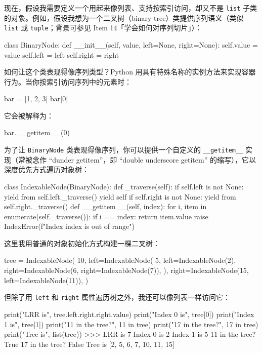 现在，假设我需要定义一个用起来像列表、支持按索引访问，却又不是 \texttt{list} 子类的对象。例如，假设我想为一个二叉树（binary tree）类提供序列语义（类似 \texttt{list} 或 \texttt{tuple}；背景可参见 Item 14「学会如何对序列切片」）：

\begin{codebox}[python]
class BinaryNode:
    def __init__(self, value, left=None, right=None):
        self.value = value
        self.left = left
        self.right = right
\end{codebox}

如何让这个类表现得像序列类型？Python 用具有特殊名称的实例方法来实现容器行为。当你按索引访问序列中的元素时：

\begin{codebox}[python]
bar = [1, 2, 3]
bar[0]
\end{codebox}

它会被解释为：

\begin{codebox}[python]
bar.__getitem__(0)
\end{codebox}

为了让 \texttt{BinaryNode} 类表现得像序列，你可以提供一个自定义的 \texttt{\_\_getitem\_\_} 实现（常被念作 ``dunder getitem''，即 ``double underscore getitem'' 的缩写），它以深度优先方式遍历对象树：

\begin{codebox}[python]
class IndexableNode(BinaryNode):
    def _traverse(self):
        if self.left is not None:
            yield from self.left._traverse()
        yield self
        if self.right is not None:
            yield from self.right._traverse()
    def __getitem__(self, index):
        for i, item in enumerate(self._traverse()):
            if i == index:
                return item.value
        raise IndexError(f"Index {index} is out of range")
\end{codebox}

这里我用普通的对象初始化方式构建一棵二叉树：

\begin{codebox}[python]
tree = IndexableNode(
    10,
    left=IndexableNode(
        5,
        left=IndexableNode(2),
        right=IndexableNode(6, right=IndexableNode(7)),
    ),
    right=IndexableNode(15, left=IndexableNode(11)),
)
\end{codebox}

但除了用 \texttt{left} 和 \texttt{right} 属性遍历树之外，我还可以像列表一样访问它：

\begin{codebox}[python]
print("LRR is", tree.left.right.right.value)
print("Index 0 is", tree[0])
print("Index 1 is", tree[1])
print("11 in the tree?", 11 in tree)
print("17 in the tree?", 17 in tree)
print("Tree is", list(tree))
>>>
LRR is 7
Index 0 is 2
Index 1 is 5
11 in the tree? True
17 in the tree? False
Tree is [2, 5, 6, 7, 10, 11, 15]
\end{codebox}

